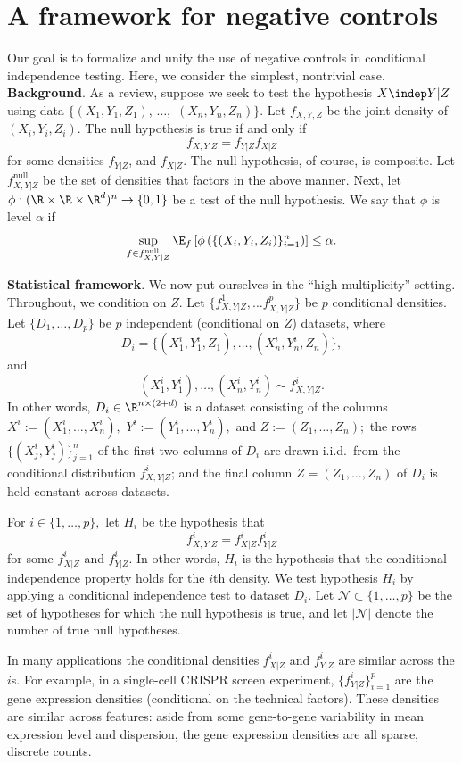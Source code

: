 \documentclass[12pt]{article}
\begin{document}
\section{A framework for negative controls}
Our goal is to formalize and unify the use of negative controls in conditional independence testing. Here, we consider the simplest, nontrivial case.
\textbf{Background}. As a review, suppose we seek to test the hypothesis $X \indep Y | Z$ using data $\{ (X_1, Y_1, Z_1)$, $\dots,$ $(X_n, Y_n, Z_n) \}$. Let $f_{X,Y,Z}$ be the joint density of $(X_i,Y_i,Z_i).$ The null hypothesis is true if and only if
$$ f_{X,Y|Z} = f_{Y|Z} f_{X|Z}$$ for some densities $f_{Y|Z}$, and $f_{X|Z}$. The null hypothesis, of course, is composite. Let $f^\textrm{null}_{X,Y|Z}$ be the set of densities that factors in the above manner. Next, let $\phi : (\R \times \R \times \R^d)^n \to \{0, 1\}$ be a test of the null hypothesis. We say that $\phi$ is level $\alpha$ if
$$ \sup_{ f \in f^\textrm{null}_{X,Y|Z}} \E_{f} \left[  \phi \left( \{ (X_i, Y_i, Z_i) \}_{i=1}^n \right)  \right]  \leq \alpha.$$

\noindent
\textbf{Statistical framework}. We now put ourselves in the ``high-multiplicity'' setting. Throughout, we condition on $Z$. Let $\{f^1_{X,Y|Z}, \dots f^p_{X,Y|Z}\}$ be $p$ conditional densities. Let $\{ D_1, \dots, D_p \}$ be $p$ independent (conditional on $Z$) datasets, where
$$D_i = \{ (X^i_1, Y^i_1, Z_1), \dots, (X^i_n, Y^i_n, Z_n) \},$$ and $$(X^i_1, Y^i_1), \dots, (X^i_n, Y^i_n) \sim f^i_{X, Y|Z}.$$ In other words, $D_i \in \R^{n \times (2 + d)}$ is a dataset consisting of the columns $X^i := (X^i_1, \dots, X^i_n),$ $Y^i := (Y^i_1, \dots, Y^i_n),$ and $Z := (Z_1, \dots, Z_n);$ the rows $\{ (X^i_j, Y^i_j) \}_{j=1}^n$ of the first two columns of $D_i$ are drawn i.i.d.\ from the conditional distribution $f^i_{X,Y|Z}$; and the final column $Z = (Z_1, \dots, Z_n)$ of $D_i$ is held constant across datasets.

For $i \in \{1, \dots, p\},$ let $H_i$ be the hypothesis that $$ f^i_{X,Y|Z} = f^i_{X|Z} f^i_{Y|Z}$$ for some $f^i_{X|Z}$ and $f^i_{Y|Z}.$ In other words, $H_i$ is the hypothesis that the conditional independence property holds for the $i$th density. We test hypothesis $H_i$ by applying a conditional independence test to dataset $D_i.$  Let $\mathcal{N} \subset \{1, \dots, p\}$ be the set of hypotheses for which the null hypothesis is true, and let $|\mathcal{N}|$ denote the number of true null hypotheses.

In many applications the conditional densities $f_{X|Z}^i$ and $f_{Y|Z}^i$ are similar across the $i$s. For example, in a single-cell CRISPR screen experiment, $\{f^i_{Y|Z}\}_{i=1}^p$ are the gene expression densities (conditional on the technical factors). These densities are similar across features: aside from some gene-to-gene variability in mean expression level and dispersion, the gene expression densities are all sparse, discrete counts.
\end{document}
